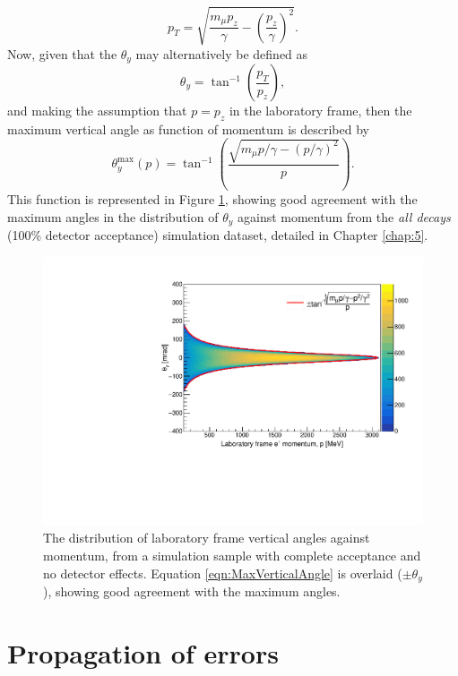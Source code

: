 \begin{appendices}
%
\begin{equation}
  p_{T} = \sqrt{\frac{ m_{\mu}p_{z}}{\gamma} - \left(\frac{p_{z}} {\gamma}\right)^{2} }.
  \label{eqn:MaxTransverseMomentum}
\end{equation} 
%
Now, given that the $\theta_{y}$ may alternatively be defined as 
%
\begin{equation}
  \theta_{y} = \tan^{-1}{\left(\frac{p_{T}}{p_{z}}\right)}, 
  \label{eqn:theta_y_alt}
\end{equation}
%
and making the assumption that $p=p_{z}$ in the laboratory frame, then the maximum vertical angle as function of momentum is described by
%
\begin{equation}
  \theta_{y}^{\text{max}}(p) = \tan^{-1} \left(\frac{\sqrt{{m_{\mu}p/\gamma} - (p/\gamma)^{2} }}{p}\right).
  \label{eqn:MaxVerticalAngle}
\end{equation}
%
This function is represented in Figure \ref{fig:MaxVerticalAngle}, showing good agreement with the maximum angles in the distribution of $\theta_{y}$ against momentum from the \textit{all decays} (100\% detector acceptance) simulation dataset, detailed in Chapter \ref{chap:5}.
%
\begin{figure}[t!]
\centering{}
\includegraphics[trim={0 0 0 0},clip,width=.69\textwidth]{Images/Appendix/2DFit.pdf}
\caption{The distribution of laboratory frame vertical angles against momentum, from a simulation sample with complete acceptance and no detector effects. Equation \ref{eqn:MaxVerticalAngle} is overlaid ($\pm \theta_{y}$), showing good agreement with the maximum angles.}
\label{fig:MaxVerticalAngle}
\end{figure}

\chapter[Propagation of errors]{Propagation of errors}\label{app:Unc}


\end{appendices}
